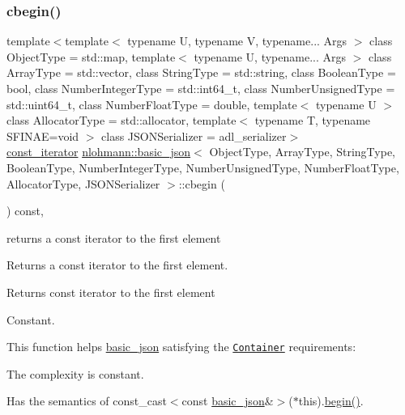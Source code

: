 \subsubsection{\texorpdfstring{cbegin()}{cbegin()}}
{\footnotesize\ttfamily template$<$template$<$ typename U, typename V, typename... Args $>$ class Object\+Type = std\+::map, template$<$ typename U, typename... Args $>$ class Array\+Type = std\+::vector, class String\+Type  = std\+::string, class Boolean\+Type  = bool, class Number\+Integer\+Type  = std\+::int64\+\_\+t, class Number\+Unsigned\+Type  = std\+::uint64\+\_\+t, class Number\+Float\+Type  = double, template$<$ typename U $>$ class Allocator\+Type = std\+::allocator, template$<$ typename T, typename S\+F\+I\+N\+A\+E=void $>$ class J\+S\+O\+N\+Serializer = adl\+\_\+serializer$>$ \\
\mbox{\hyperlink{classnlohmann_1_1basic__json_a41a70cf9993951836d129bb1c2b3126a}{const\+\_\+iterator}} \mbox{\hyperlink{classnlohmann_1_1basic__json}{nlohmann\+::basic\+\_\+json}}$<$ Object\+Type, Array\+Type, String\+Type, Boolean\+Type, Number\+Integer\+Type, Number\+Unsigned\+Type, Number\+Float\+Type, Allocator\+Type, J\+S\+O\+N\+Serializer $>$\+::cbegin (\begin{DoxyParamCaption}{ }\end{DoxyParamCaption}) const\hspace{0.3cm}{\ttfamily [inline]}, {\ttfamily [noexcept]}}



returns a const iterator to the first element 

Returns a const iterator to the first element.

 \begin{DoxyReturn}{Returns}
const iterator to the first element
\end{DoxyReturn}
Constant.

This function helps {\ttfamily \mbox{\hyperlink{classnlohmann_1_1basic__json}{basic\+\_\+json}}} satisfying the \href{http://en.cppreference.com/w/cpp/concept/Container}{\tt Container} requirements\+:
\begin{DoxyItemize}
\item The complexity is constant.
\item Has the semantics of {\ttfamily const\+\_\+cast$<$const \mbox{\hyperlink{classnlohmann_1_1basic__json}{basic\+\_\+json}}\&$>$($\ast$this).\mbox{\hyperlink{classnlohmann_1_1basic__json_a0ff28dac23f2bdecee9564d07f51dcdc}{begin()}}}.
\end{DoxyItemize}

